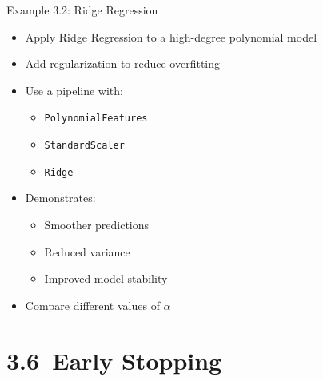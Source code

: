 \documentclass[aspectratio=169]{beamer}
\begin{document}
\begin{frame}{Example 3.2: Ridge Regression}
	
	\begin{itemize}
		\item Apply Ridge Regression to a high-degree polynomial model
		\item Add regularization to reduce overfitting
		\item Use a pipeline with:
		\begin{itemize}
			\item \texttt{PolynomialFeatures}
			\item \texttt{StandardScaler}
			\item \texttt{Ridge}
		\end{itemize}
		
		\vspace{0.5em}
		
		\item Demonstrates:
		\begin{itemize}
			\item Smoother predictions
			\item Reduced variance
			\item Improved model stability
		\end{itemize}
		
		\vspace{0.5em}
		
		\item Compare different values of $\alpha$
	\end{itemize}
	
\end{frame}

\section{3.6~Early Stopping}
\end{document}
